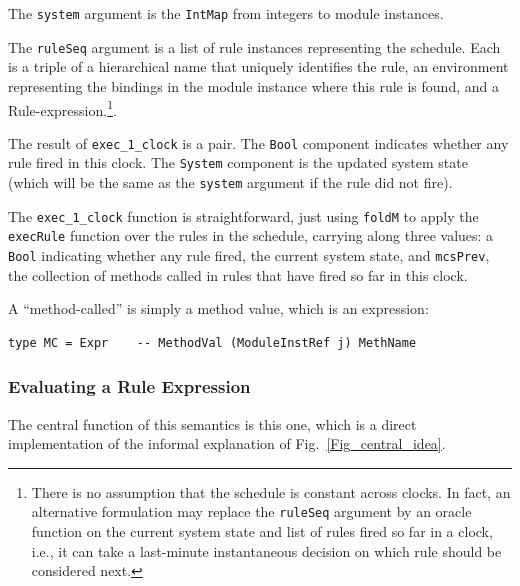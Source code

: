 \documentclass[11pt]{article}
\newcommand{\term}[1]{\texttt{#1}}
\begin{document}
The \term{system} argument is the \term{IntMap} from integers to
module instances.

The \term{ruleSeq} argument is a list of rule instances representing
the schedule.  Each is a triple of a hierarchical name that uniquely
identifies the rule, an environment representing the bindings in the
module instance where this rule is found, and a
Rule-expression.\footnote{ There is no assumption that the schedule is
constant across clocks.  In fact, an alternative formulation may
replace the \term{ruleSeq} argument by an oracle function on the
current system state and list of rules fired so far in a clock, i.e.,
it can take a last-minute instantaneous decision on which rule should
be considered next.}.

The result of \term{exec\_1\_clock} is a pair. The \term{Bool} component
indicates whether any rule fired in this clock. The \term{System}
component is the updated system state (which will be the same as the
\term{system} argument if the rule did not fire).

The \verb|exec_1_clock| function is straightforward, just using
\term{foldM} to apply the \term{execRule} function over the rules in
the schedule, carrying along three values: a \term{Bool} indicating
whether any rule fired, the current system state, and \term{mcsPrev},
the collection of methods called in rules that have fired so far in
this clock.

A ``method-called'' is simply a method value, which is an expression:

\begin{Verbatim}[frame=single, commandchars=\\\{\}]
type MC = Expr    -- MethodVal (ModuleInstRef j) MethName
\end{Verbatim}


\subsubsection{Evaluating a Rule Expression}

The central function of this semantics is this one, which is a direct
implementation of the informal explanation of
Fig.~\ref{Fig_central_idea}.
\end{document}
